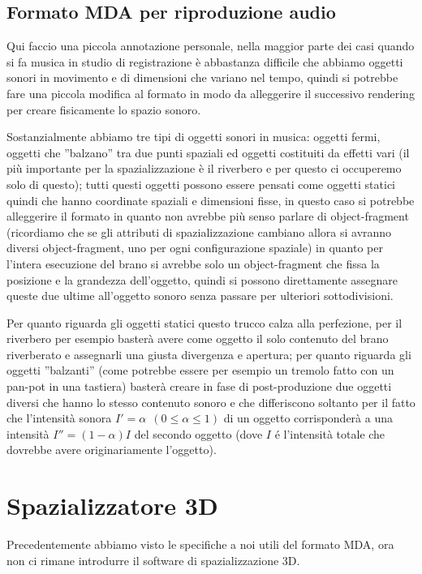 \documentclass[12pt,a4paper]{report}
\begin{document}
\subsection{Formato MDA per riproduzione audio}

Qui faccio una piccola annotazione personale, nella maggior parte dei casi quando si fa musica in studio di registrazione è abbastanza difficile che abbiamo oggetti sonori in movimento e di dimensioni che variano nel tempo, quindi si potrebbe fare una piccola modifica al formato in modo da alleggerire il successivo rendering per creare fisicamente lo spazio sonoro.

Sostanzialmente abbiamo tre tipi di oggetti sonori in musica: oggetti fermi, oggetti che ''balzano'' tra due punti spaziali ed oggetti costituiti da effetti vari (il più importante per la spazializzazione è il riverbero e per questo ci occuperemo solo di questo); tutti questi oggetti possono essere pensati come oggetti statici quindi che hanno coordinate spaziali e dimensioni fisse, in questo caso si potrebbe alleggerire il formato in quanto non avrebbe più senso parlare di object-fragment (ricordiamo che se gli attributi di spazializzazione cambiano allora si avranno diversi object-fragment, uno per ogni configurazione spaziale) in quanto per l'intera esecuzione del brano si avrebbe solo un object-fragment che fissa la posizione e la grandezza dell'oggetto, quindi si possono direttamente assegnare queste due ultime all'oggetto sonoro senza passare per ulteriori sottodivisioni.

Per quanto riguarda gli oggetti statici questo trucco calza alla perfezione, per il riverbero per esempio basterà avere come oggetto il solo contenuto del brano riverberato e assegnarli una giusta divergenza e apertura; per quanto riguarda gli oggetti ''balzanti'' (come potrebbe essere per esempio un tremolo fatto con un pan-pot in una tastiera) basterà creare in fase di post-produzione due oggetti diversi che hanno lo stesso contenuto sonoro e che differiscono soltanto per il fatto che l'intensità sonora $I'=\alpha \ \ (0\leq \alpha \leq 1)$ di un oggetto corrisponderà a una intensità $I''=(1-\alpha) I$ del secondo oggetto (dove $I$ é l'intensità totale che dovrebbe avere originariamente l'oggetto).

\section{Spazializzatore 3D}

Precedentemente abbiamo visto le specifiche a noi utili del formato MDA, ora non ci rimane introdurre il software di spazializzazione 3D.
\end{document}
